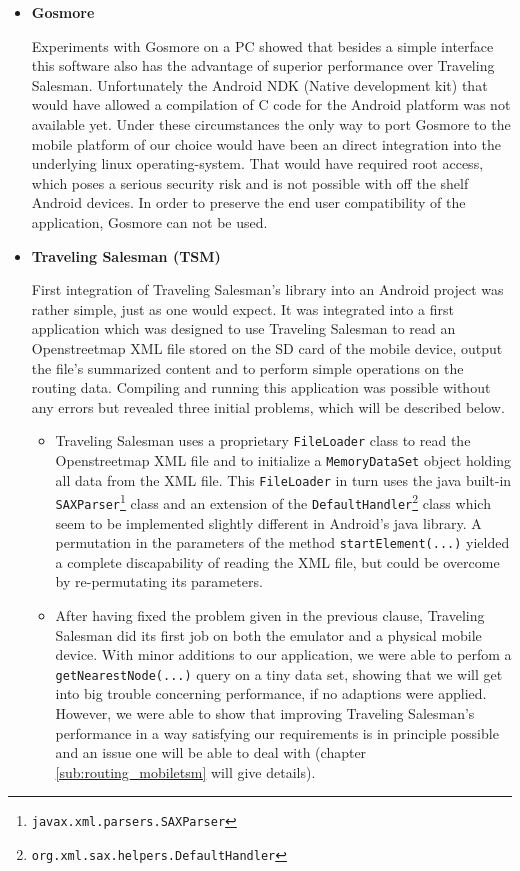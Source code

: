 \begin{itemize}

	\item \textbf{Gosmore}	
	
		Experiments with Gosmore on a PC showed that besides a simple interface this software also has the advantage of superior performance over Traveling Salesman. Unfortunately the Android NDK (Native development kit) that would have allowed a compilation of C code for the Android platform was not available yet. Under these circumstances the only way to port Gosmore to the mobile platform of our choice would have been an direct integration into the underlying linux operating-system. That would have required root access, which poses a serious security risk and is not possible with off the shelf Android devices. In order to preserve the end user compatibility of  the application, Gosmore can not be used.
	
	\item \textbf{Traveling Salesman (TSM)}
	
		First integration of Traveling Salesman's library into an Android project was rather simple, just as one would expect. It was integrated into a first application which was designed to use Traveling Salesman to read an Openstreetmap XML file stored on the SD card of the mobile device, output the file's summarized content and to perform simple operations on the routing data. Compiling and running this application was possible without any errors but revealed three initial problems, which will be described below.
		
		\begin{itemize}
		
			\item Traveling Salesman uses a proprietary \texttt{FileLoader} class to read the Openstreetmap XML file and to initialize a  \texttt{MemoryDataSet} object holding all data from the XML file. This \texttt{FileLoader} in turn uses the java built-in  \texttt{SAXParser}\footnote{ \texttt{javax.xml.parsers.SAXParser}} class and an extension of the  \texttt{DefaultHandler}\footnote{\texttt{org.xml.sax.helpers.DefaultHandler}} class which seem to be implemented slightly different in Android's java library. A permutation in the parameters of the method  \texttt{startElement(...)} yielded a complete discapability of reading the XML file, but could be overcome by re-permutating its parameters.
			
			\item After having fixed the problem given in the previous clause, Traveling Salesman did its first job on both the emulator and a physical mobile device. With minor additions to our application, we were able to perfom a \texttt{getNearestNode(...)} query on a tiny data set, showing that we will get into big trouble concerning performance, if no adaptions were applied. However, we were able to show that improving Traveling Salesman's performance in a way satisfying our requirements is in principle possible and an issue one will be able to deal with (chapter \ref{sub:routing_mobiletsm} will give details).	


\end{itemize}
\end{itemize}
